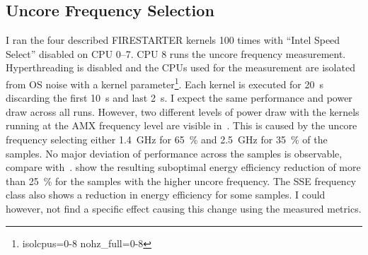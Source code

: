 \subsection{Uncore Frequency Selection}
\label{sec:avx-anomalies-uncore-freqency}

I ran the four described FIRESTARTER kernels \SI{100}{} times with ``Intel Speed Select'' disabled on CPU 0--7.
CPU 8 runs the uncore frequency measurement.
Hyperthreading is disabled and the CPUs used for the measurement are isolated from OS noise with a kernel parameter\footnote{isolcpus=0-8 nohz\_full=0-8}.
Each kernel is executed for \SI{20}{\s} discarding the first \SI{10}{\s} and last \SI{2}{\s}.
I expect the same performance and power draw across all runs.
However, two different levels of power draw with the kernels running at the AMX frequency level are visible in~.
This is caused by the uncore frequency selecting either \SI{1.4}{\GHz} for \SI{65}{\percent} and \SI{2.5}{\GHz} for \SI{35}{\percent} of the samples.
No major deviation of performance across the samples is observable, compare with~.
 show the resulting suboptimal energy efficiency reduction of more than \SI{25}{\percent} for the samples with the higher uncore frequency.
The SSE frequency class also shows a reduction in energy efficiency for some samples.
I could however, not find a specific effect causing this change using the measured metrics.

